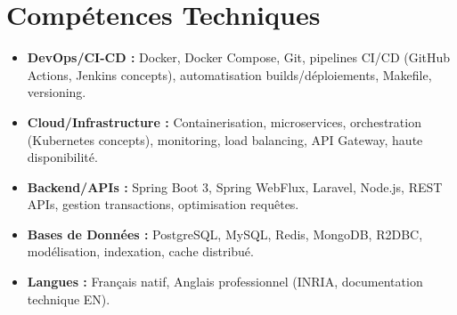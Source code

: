 \documentclass[a4paper,11pt]{article}
\begin{document}
\section{Comp\'etences Techniques}
\begin{itemize}[leftmargin=*, label=\tiny$\bullet$, nosep]
    \item \textbf{DevOps/CI-CD :} Docker, Docker Compose, Git, pipelines CI/CD (GitHub Actions, Jenkins concepts), automatisation builds/d\'eploiements, Makefile, versioning.
    \item \textbf{Cloud/Infrastructure :} Containerisation, microservices, orchestration (Kubernetes concepts), monitoring, load balancing, API Gateway, haute disponibilit\'e.
    \item \textbf{Backend/APIs :} Spring Boot 3, Spring WebFlux, Laravel, Node.js, REST APIs, gestion transactions, optimisation requêtes.
    \item \textbf{Bases de Donn\'ees :} PostgreSQL, MySQL, Redis, MongoDB, R2DBC, mod\'elisation, indexation, cache distribu\'e.
    \item \textbf{Langues :} Fran\c{c}ais natif, Anglais professionnel (INRIA, documentation technique EN).
\end{itemize}
\end{document}

